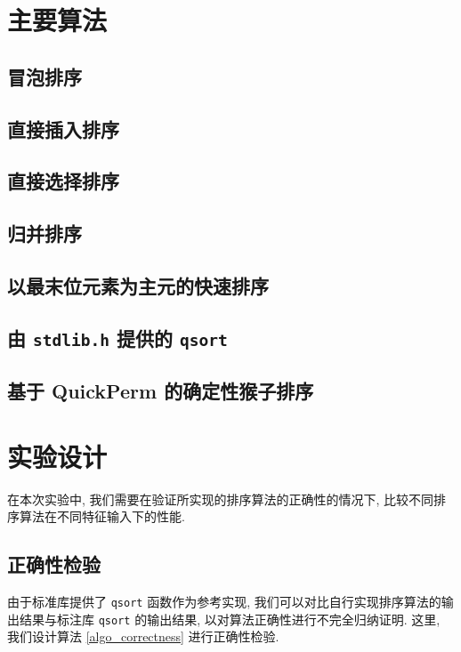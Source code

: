 \documentclass[12pt]{article}
\begin{document}
\section{主要算法}

\subsection{冒泡排序}

\subsection{直接插入排序}

\subsection{直接选择排序}

\subsection{归并排序}

\subsection{以最末位元素为主元的快速排序}

\subsection{由 \texttt{stdlib.h} 提供的 \texttt{qsort}}

\subsection{基于 QuickPerm 的确定性猴子排序}

\section{实验设计}

在本次实验中, 我们需要在验证所实现的排序算法的正确性的情况下, 比较不同排序算法在不同特征输入下的性能.

\subsection{正确性检验}

由于标准库提供了 \texttt{qsort} 函数作为参考实现, 我们可以对比自行实现排序算法的输出结果与标注库 \texttt{qsort} 的输出结果, 以对算法正确性进行不完全归纳证明. 这里, 我们设计算法 \ref{algo_correctness} 进行正确性检验.
\end{document}

